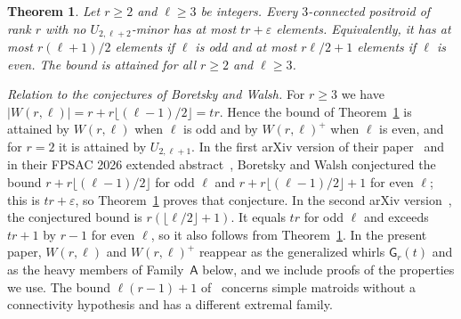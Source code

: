 \documentclass[11pt]{amsart}
\newtheorem{theorem}{Theorem}[section]
\theoremstyle{definition}
\theoremstyle{remark}
\numberwithin{equation}{section}
\newcommand{\GW}{\mathsf{G}}
\newcommand{\FA}{\mathsf{A}}
\begin{document}
\begin{theorem}\label{thm:bound}
Let $r\ge 2$ and $\ell\ge 3$ be integers. Every $3$-connected positroid of rank $r$ with no $U_{2,\ell+2}$-minor has at most $tr+\varepsilon$ elements. Equivalently, it has at most $r(\ell+1)/2$ elements if $\ell$ is odd and at most $r\ell/2+1$ elements if $\ell$ is even. The bound is attained for all $r\ge 2$ and $\ell\ge 3$.
\end{theorem}

\emph{Relation to the conjectures of Boretsky and Walsh.} For $r\ge3$ we have $|W(r,\ell)|=r+r\lfloor(\ell-1)/2\rfloor=tr$. Hence the bound of Theorem~\ref{thm:bound} is attained by $W(r,\ell)$ when $\ell$ is odd and by $W(r,\ell)^+$ when $\ell$ is even, and for $r=2$ it is attained by $U_{2,\ell+1}$. In the first arXiv version of their paper~\cite[Conjecture~6.1]{BW25} and in their FPSAC 2026 extended abstract~\cite[Conjecture~6.1]{BW26a}, Boretsky and Walsh conjectured the bound $r+r\lfloor(\ell-1)/2\rfloor$ for odd $\ell$ and $r+r\lfloor(\ell-1)/2\rfloor+1$ for even $\ell$; this is $tr+\varepsilon$, so Theorem~\ref{thm:bound} proves that conjecture. In the second arXiv version~\cite[Conjecture~7.1]{BW26v2}, the conjectured bound is $r(\lfloor\ell/2\rfloor+1)$. It equals $tr$ for odd $\ell$ and exceeds $tr+1$ by $r-1$ for even $\ell$, so it also follows from Theorem~\ref{thm:bound}. In the present paper, $W(r,\ell)$ and $W(r,\ell)^+$ reappear as the generalized whirls $\GW_r(t)$ and as the heavy members of Family~$\FA$ below, and we include proofs of the properties we use. The bound $\ell(r-1)+1$ of~\cite{BW26,CL26} concerns simple matroids without a connectivity hypothesis and has a different extremal family.
\end{document}
